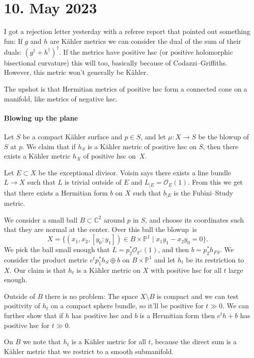 \documentclass[11pt]{article}
\theoremstyle{definition}
\newcommand{\kk}[1]{\mathbb{#1}}
\newcommand{\cc}[1]{\mathcal{#1}}
\begin{document}
\section{10. May 2023}

I got a rejection letter yesterday with a referee report that pointed out
something fun: If $g$ and $h$ are K\"ahler metrics we can consider the dual of
the sum of their duals: $(g^\dagger + h^\dagger)^\dagger$.
If the metrics have positive hsc (or positive holomorphic bisectional curvature)
this will too, basically because of Codazzi--Griffiths.
However, this metric won't generally be K\"ahler.

The upshot is that Hermitian metrics of positive hsc form a connected cone on a
manifold, like metrics of negative hsc.

\paragraph{Blowing up the plane}

Let $S$ be a compact K\"ahler surface and $p \in S$,
and let $\mu : X \to S$ be the blowup of $S$ at $p$.
We claim that if $h_S$ is a K\"ahler metric of positive hsc on $S$,
then there exists a K\"ahler metric $h_X$ of positive hsc on~$X$.

Let $E \subset X$ be the exceptional divisor.
Voisin says there exists a line bundle $L \to X$ such that $L$ is trivial outside
of $E$ and $L_{|E} = \cc O_E(1)$.
From this we get that there exists a Hermitian form $b$ on $X$ such that
$b_{|E}$ is the Fubini--Study metric.

We consider a small ball $B \subset \kk C^2$ around $p$ in $S$,
and choose its coordinates such that they are normal at the center.
Over this ball the blowup~is%
$$
X = \{ (x_1, x_2, [y_0: y_1]) \in B \times \kk P^1
\mid x_1 y_1 - x_2 y_0 = 0 \}.
$$
We pick the ball small enough that $L = p_2^*\cc O_{\kk P^1}(1)$,
and then $b = p_2^* h_{FS}$.
We consider the product metric $e^t p_1^*h_S \oplus b$ on $B \times \kk P^1$
and let $h_t$ be its restriction to $X$.
Our claim is that $h_t$ is a K\"ahler metric on $X$ with positive hsc for all
$t$ large enough.

Outside of $B$ there is no problem:
The space $X \setminus B$ is compact and we can test positivity of $h_t$ on a
compact sphere bundle, so it'll be positive for $t \gg 0$.
We can further show that if $h$ has positive hsc and $b$ is a Hermitian form
then $e^t h + b$ has positive hsc for $t \gg 0$.

On $B$ we note that $h_t$ is a K\"ahler metric for all $t$, because the direct
sum is a K\"ahler metric that we restrict to a smooth submanifold.
\end{document}
